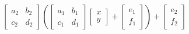 \documentclass{article}
\begin{document}
\thispagestyle{empty}
$$
\begin{bmatrix}a_2&b_2\\c_2&d_2\end{bmatrix}
\left(\begin{bmatrix}a_1&b_1\\c_1&d_1\end{bmatrix}\begin{bmatrix}x\\y\end{bmatrix} + \begin{bmatrix}e_1\\f_1\end{bmatrix}\right)
+\begin{bmatrix}e_2\\f_2\end{bmatrix}
$$
\end{document}
